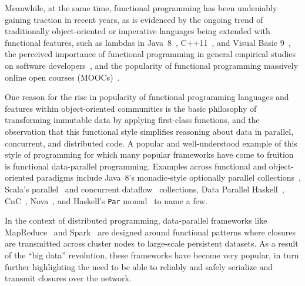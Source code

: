 \documentclass[runningheads]{llncs}
\begin{document}
\begin{sloppypar}
Meanwhile, at the same time, functional programming has been undeniably
gaining traction in recent years, as is evidenced by the ongoing trend of
traditionally object-oriented or imperative languages being extended with
functional features, such as lambdas in \mbox{Java 8}~\cite{JavaLambdas},
C++11~\cite{CplusplusLambas}, and Visual Basic 9~\cite{Meijer}, the perceived
importance of functional programming in general empirical studies on software
developers~\cite{PLAdoption}, and the popularity of functional
programming massively online open courses (MOOCs)~\cite{ICSEMOOC}.


One reason for the rise in popularity of functional programming languages and
features within object-oriented communities is the basic philosophy of
transforming immutable data by applying first-class functions, and the
observation that this functional style simplifies reasoning about data in
parallel, concurrent, and distributed code. A popular and well-understood
example of this style of programming for which many popular frameworks have
come to fruition is functional data-parallel programming.
Examples across functional and object-oriented paradigms include \mbox{Java
8}'s monadic-style optionally parallel collections~\cite{JavaLambdas}, Scala's
parallel~\cite{ScalaParColls} and concurrent dataflow~\cite{FlowPools}
collections, Data Parallel Haskell~\cite{DataParallelHaskell}, CnC~\cite{CnC}, Nova~\cite{Nova}, and Haskell's \verb|Par|
monad~\cite{HaskellPar} to name a few.


In the context of distributed programming, data-parallel frameworks like
MapReduce~\cite{MapReduce} and Spark~\cite{Spark} are designed
around functional patterns where closures are
transmitted across cluster nodes to large-scale persistent datasets. As a result of the ``big data'' revolution,
these frameworks have become very popular, in turn further highlighting the
need to be able to reliably and safely serialize and transmit closures over
the network.


\end{sloppypar}
\end{document}
